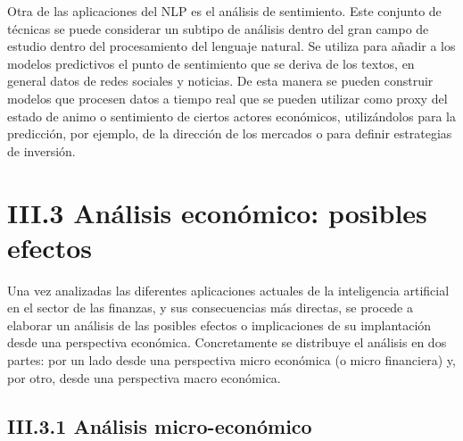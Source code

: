 \documentclass[]{DissertateUSU}
\begin{document}
\noindent Otra de las aplicaciones del NLP es el análisis de
sentimiento. Este conjunto de técnicas se puede considerar un subtipo de
análisis dentro del gran campo de estudio dentro del procesamiento del
lenguaje natural. Se utiliza para añadir a los modelos predictivos el
punto de sentimiento que se deriva de los textos, en general datos de
redes sociales y noticias. De esta manera se pueden construir modelos
que procesen datos a tiempo real que se pueden utilizar como proxy del
estado de animo o sentimiento de ciertos actores económicos,
utilizándolos para la predicción, por ejemplo, de la dirección de los
mercados o para definir estrategias de inversión.

\FloatBarrier
{}
\fancyfoot[C]{\thepage}

\section{III.3 \textbf{Análisis económico: posibles efectos}}

\noindent Una vez analizadas las diferentes aplicaciones actuales de la
inteligencia artificial en el sector de las finanzas, y sus
consecuencias más directas, se procede a elaborar un análisis de las
posibles efectos o implicaciones de su implantación desde una
perspectiva económica. Concretamente se distribuye el análisis en dos
partes: por un lado desde una perspectiva micro económica (o micro
financiera) y, por otro, desde una perspectiva macro económica.

\FloatBarrier
{}
\fancyfoot[C]{\thepage}

\subsection{III.3.1 \textbf{Análisis micro-económico}}

\justifying
\end{document}
